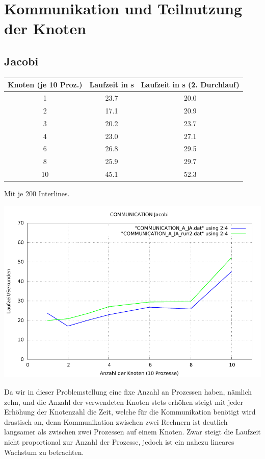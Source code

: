 \documentclass[a4paper]{article}
\begin{document}
\section{Kommunikation und Teilnutzung der Knoten}
\subsection{Jacobi}
\begin{tabular}{|c|c|c|}
\hline 
Knoten (je 10 Proz.) & Laufzeit in s & Laufzeit in s (2. Durchlauf) \\ 
\hline 
1 & 23.7 & 20.0 \\ 
\hline 
2 & 17.1 & 20.9 \\ 
\hline 
3 & 20.2 & 23.7 \\ 
\hline 
4 & 23.0 & 27.1 \\ 
\hline 
6 & 26.8 & 29.5 \\ 
\hline 
8 & 25.9 & 29.7 \\ 
\hline 
10 & 45.1 & 52.3 \\ 
\hline 
\end{tabular} 

Mit je 200 Interlines.

\includegraphics[scale=0.8]{img/COMMUNICATION_JA_laufzeit.pdf}

Da wir in dieser Problemstellung eine fixe Anzahl an Prozessen haben, nämlich zehn, und die Anzahl der verwendeten Knoten stets erhöhen steigt mit jeder Erhöhung der Knotenzahl die Zeit, welche für die Kommunikation benötigt wird drastisch an, denn Kommunikation zwischen zwei Rechnern ist deutlich langsamer als zwischen zwei Prozessen auf einem Knoten. Zwar steigt die Laufzeit nicht proportional zur Anzahl der Prozesse, jedoch ist ein nahezu lineares Wachstum zu betrachten.
\end{document}
